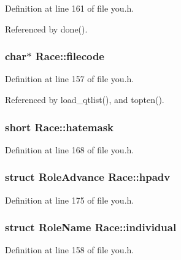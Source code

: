 Definition at line 161 of file you.\+h.



Referenced by done().

\hypertarget{structRace_a897f9034ff9163ef0ebcc9ebee43e3c3}{
\subsubsection[{filecode}]{ char$\ast$ Race\+::filecode}}\label{structRace_a897f9034ff9163ef0ebcc9ebee43e3c3}


Definition at line 157 of file you.\+h.



Referenced by load\+\_\+qtlist(), and topten().

\hypertarget{structRace_abd24782a32cd0c7fab40ba97dce945f4}{
\subsubsection[{hatemask}]{\setlength{\rightskip}{0pt plus 5cm}short Race\+::hatemask}}\label{structRace_abd24782a32cd0c7fab40ba97dce945f4}


Definition at line 168 of file you.\+h.

\hypertarget{structRace_ab04a220ff266bdf1029c414974e85db8}{
\subsubsection[{hpadv}]{\setlength{\rightskip}{0pt plus 5cm}struct {\bf Role\+Advance} Race\+::hpadv}}\label{structRace_ab04a220ff266bdf1029c414974e85db8}


Definition at line 175 of file you.\+h.

\hypertarget{structRace_ad212db19e838175368f11ba7ee28aa68}{
\subsubsection[{individual}]{\setlength{\rightskip}{0pt plus 5cm}struct {\bf Role\+Name} Race\+::individual}}\label{structRace_ad212db19e838175368f11ba7ee28aa68}


Definition at line 158 of file you.\+h.

